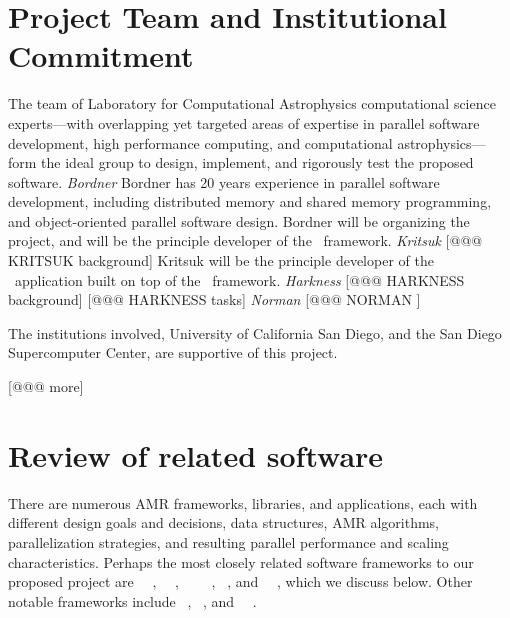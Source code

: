\documentclass[11pt,letterpaper]{article}
\begin{document}
\section{Project Team and Institutional Commitment}

The team of Laboratory for Computational Astrophysics computational
science experts---with overlapping yet targeted areas of expertise in
parallel software development, high performance computing, and
computational astrophysics---form the ideal group to design,
implement, and rigorously test the proposed software.
%
\textit{Bordner} Bordner has 20 years experience in parallel software development,
including distributed memory and shared memory programming, and object-oriented
parallel software design.
Bordner will be organizing the project, and will be the principle developer
of the \cello\ framework.
\textit{Kritsuk} [@@@ KRITSUK background] Kritsuk will be the principle
developer of the \enzoii\ application built on top of the \cello\ framework.
%
\textit{Harkness} [@@@ HARKNESS background] [@@@ HARKNESS tasks]
%
\textit{Norman} [@@@ NORMAN ]


The institutions involved, University of California San Diego, and 
the San Diego Supercomputer Center, are supportive of this project.

[@@@ more]


%

\section{Review of related software} \label{s:review}

There are numerous AMR frameworks, libraries, and applications, each
with different design goals and decisions, data structures, AMR
algorithms, parallelization strategies, and resulting parallel
performance and scaling characteristics.  Perhaps the most closely
related software frameworks to our proposed project are
\samrai~\cite{WiHo01}~\cite{wwwsamraicode},
\chombo~\cite{wwwchombo}~\cite{CoGr09},
\paramesh~\cite{MaOl00}~\cite{OlMa05}~\cite{Ol06}~\cite{wwwparamesh},
\alps~\cite{BuBu09}, and \gadget~\cite{wwwgadget}~\cite{Sp05}, which
we discuss below.  Other notable frameworks include
\clawpack~\cite{wwwclawpack}, \grace~\cite{PaLi10}, and
\carpet~\cite{ScDi06}~\cite{wwwcarpet}.  
\end{document}
